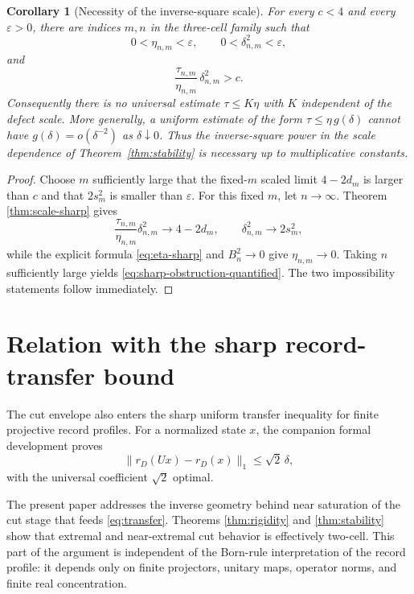 \documentclass[11pt]{article}
\newtheorem{corollary}[theorem]{Corollary}
\newcommand{\dd}{\delta}
\newcommand{\etaq}{\eta}
\newcommand{\tauq}{\tau}
\begin{document}
\begin{corollary}[Necessity of the inverse-square scale]
For every $c<4$ and every $\varepsilon>0$, there are indices $m,n$ in the
three-cell family such that
\[
  0<\etaq_{n,m}<\varepsilon,\qquad
  0<\dd_{n,m}^2<\varepsilon,
\]
and
\begin{equation}\label{eq:sharp-obstruction-quantified}
  \frac{\tauq_{n,m}}{\etaq_{n,m}}\,
  \dd_{n,m}^2>c.
\end{equation}
Consequently there is no universal estimate
$\tauq\le K\etaq$ with $K$ independent of the defect scale.  More generally,
a uniform estimate of the form
$\tauq\le \etaq\,g(\dd)$ cannot have
$g(\dd)=o(\dd^{-2})$ as $\dd\downarrow0$.  Thus the inverse-square power in
the scale dependence of Theorem~\ref{thm:stability} is necessary up to
multiplicative constants.
\end{corollary}

\begin{proof}
Choose $m$ sufficiently large that the fixed-$m$ scaled limit
$4-2d_m$ is larger than $c$ and that $2s_m^2$ is smaller than
$\varepsilon$.  For this fixed $m$, let $n\to\infty$.  Theorem
\ref{thm:scale-sharp} gives
\[
  \frac{\tauq_{n,m}}{\etaq_{n,m}}\dd_{n,m}^2
  \longrightarrow 4-2d_m,
  \qquad
  \dd_{n,m}^2\longrightarrow2s_m^2,
\]
while the explicit formula \eqref{eq:eta-sharp} and
$B_n^2\to0$ give $\etaq_{n,m}\to0$.  Taking $n$ sufficiently large yields
\eqref{eq:sharp-obstruction-quantified}.  The two impossibility statements
follow immediately.
\end{proof}

\section{Relation with the sharp record-transfer bound}

The cut envelope also enters the sharp uniform transfer inequality for finite
projective record profiles.  For a normalized state $x$, the companion
formal development proves
\begin{equation}\label{eq:transfer}
  \|r_D(Ux)-r_D(x)\|_1
  \le
  \sqrt2\,\dd,
\end{equation}
with the universal coefficient $\sqrt2$ optimal.

The present paper addresses the inverse geometry behind near saturation of
the cut stage that feeds \eqref{eq:transfer}.  Theorems
\ref{thm:rigidity} and \ref{thm:stability} show that extremal and
near-extremal cut behavior is effectively two-cell.  This part of the
argument is independent of the Born-rule interpretation of the record
profile: it depends only on finite projectors, unitary maps, operator norms,
and finite real concentration.
\end{document}
